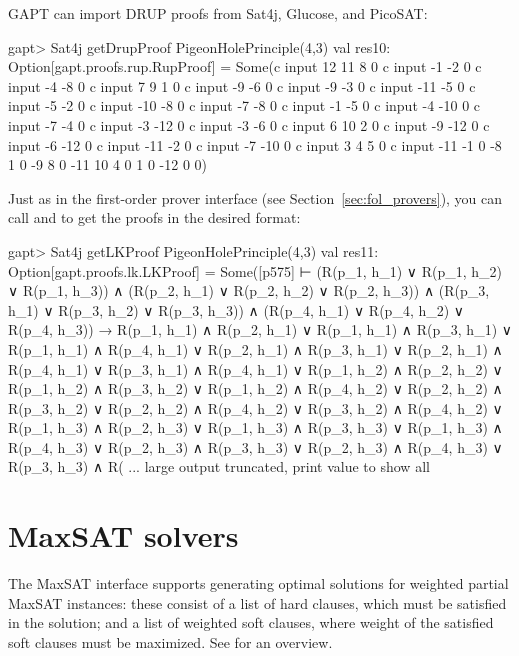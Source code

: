 \documentclass[a4paper,11pt]{book}
\newcommand{\cli}[1]{{\ttfamily {#1}}}
\begin{document}
GAPT can import DRUP proofs from Sat4j, Glucose, and PicoSAT:
\begin{clilisting}
  gapt> Sat4j getDrupProof PigeonHolePrinciple(4,3)
  val res10: Option[gapt.proofs.rup.RupProof] = Some(c input 12 11 8 0
  c input -1 -2 0
  c input -4 -8 0
  c input 7 9 1 0
  c input -9 -6 0
  c input -9 -3 0
  c input -11 -5 0
  c input -5 -2 0
  c input -10 -8 0
  c input -7 -8 0
  c input -1 -5 0
  c input -4 -10 0
  c input -7 -4 0
  c input -3 -12 0
  c input -3 -6 0
  c input 6 10 2 0
  c input -9 -12 0
  c input -6 -12 0
  c input -11 -2 0
  c input -7 -10 0
  c input 3 4 5 0
  c input -11 -1 0
  -8 1 0
  -9 8 0
  -11 10 4 0
  1 0
  -12 0
  0)

\end{clilisting}

Just as in the first-order prover interface (see Section~\ref{sec:fol_provers}), you can call
\cli{getResolutionProof} and \cli{getLKProof} to get the proofs in the desired
format:
\begin{clilisting}
  gapt> Sat4j getLKProof PigeonHolePrinciple(4,3)
  val res11: Option[gapt.proofs.lk.LKProof] = Some([p575]
  ⊢
  (R(p_1, h_1) ∨ R(p_1, h_2) ∨ R(p_1, h_3)) ∧
  (R(p_2, h_1) ∨ R(p_2, h_2) ∨ R(p_2, h_3)) ∧
  (R(p_3, h_1) ∨ R(p_3, h_2) ∨ R(p_3, h_3)) ∧
  (R(p_4, h_1) ∨ R(p_4, h_2) ∨ R(p_4, h_3)) →
  R(p_1, h_1) ∧ R(p_2, h_1) ∨
  R(p_1, h_1) ∧ R(p_3, h_1) ∨
  R(p_1, h_1) ∧ R(p_4, h_1) ∨
  R(p_2, h_1) ∧ R(p_3, h_1) ∨
  R(p_2, h_1) ∧ R(p_4, h_1) ∨
  R(p_3, h_1) ∧ R(p_4, h_1) ∨
  R(p_1, h_2) ∧ R(p_2, h_2) ∨
  R(p_1, h_2) ∧ R(p_3, h_2) ∨
  R(p_1, h_2) ∧ R(p_4, h_2) ∨
  R(p_2, h_2) ∧ R(p_3, h_2) ∨
  R(p_2, h_2) ∧ R(p_4, h_2) ∨
  R(p_3, h_2) ∧ R(p_4, h_2) ∨
  R(p_1, h_3) ∧ R(p_2, h_3) ∨
  R(p_1, h_3) ∧ R(p_3, h_3) ∨
  R(p_1, h_3) ∧ R(p_4, h_3) ∨
  R(p_2, h_3) ∧ R(p_3, h_3) ∨
  R(p_2, h_3) ∧ R(p_4, h_3) ∨
  R(p_3, h_3) ∧ R( ... large output truncated, print value to show all

\end{clilisting}

\section{MaxSAT solvers}

The MaxSAT interface supports generating optimal solutions for weighted partial
MaxSAT instances: these consist of a list of hard clauses, which must be
satisfied in the solution; and a list of weighted soft clauses, where weight of
the satisfied soft clauses must be maximized.  See \cite{Argelich2008First}
for an overview.
\end{document}
